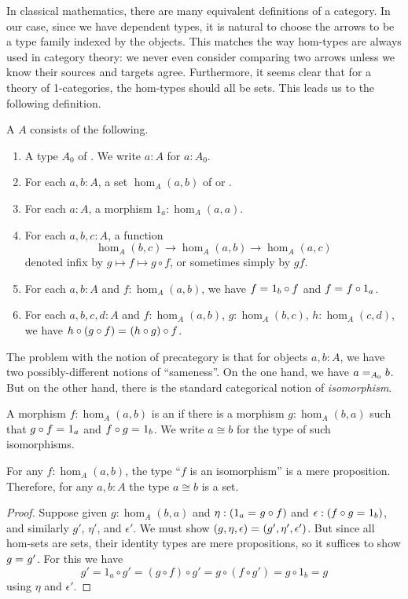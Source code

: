 In classical mathematics, there are many equivalent definitions of a category.
In our case, since we have dependent types, it is natural to choose the arrows to be a type family indexed by the objects.
This matches the way hom-types are always used in category theory: we never even consider comparing two arrows unless we know their sources and targets agree.
Furthermore, it seems clear that for a theory of 1-categories, the hom-types should all be sets.
This leads us to the following definition.

\begin{defn}\label{ct:precategory}
  A  $A$ consists of the following.
  \begin{enumerate}
  \item A type $A_0$ of .  We write $a:A$ for $a:A_0$.
  \item For each $a,b:A$, a set $\hom_A(a,b)$ of  or .
  \item For each $a:A$, a morphism $1_a:\hom_A(a,a)$.
  \item For each $a,b,c:A$, a function
    \[  \hom_A(b,c) \to \hom_A(a,b) \to \hom_A(a,c) \]
    denoted infix by $g\mapsto f\mapsto g\circ f$, or sometimes simply by $gf$.
  \item For each $a,b:A$ and $f:\hom_A(a,b)$, we have $\id f {1_b\circ f}$ and $\id f {f\circ 1_a}$.
  \item For each $a,b,c,d:A$ and $f:\hom_A(a,b)$, $g:\hom_A(b,c)$, $h:\hom_A(c,d)$, we have $\id {h\circ (g\circ f)}{(h\circ g)\circ f}$.
  \end{enumerate}
\end{defn}

The problem with the notion of precategory is that for objects $a,b:A$, we have two possibly-different notions of ``sameness''.
On the one hand, we have $\id[A_0]{a}{b}$.
But on the other hand, there is the standard categorical notion of \emph{isomorphism}.

\begin{defn}\label{ct:isomorphism}
  A morphism $f:\hom_A(a,b)$ is an  if there is a morphism $g:\hom_A(b,a)$ such that $\id{g\circ f}{1_a}$ and $\id{f\circ g}{1_b}$.
  We write $a\cong b$ for the type of such isomorphisms.
\end{defn}

\begin{lem}\label{ct:isoprop}
  For any $f:\hom_A(a,b)$, the type ``$f$ is an isomorphism'' is a mere proposition.
  Therefore, for any $a,b:A$ the type $a\cong b$ is a set.
\end{lem}
\begin{proof}
  Suppose given $g:\hom_A(b,a)$ and $\eta:(\id{1_a}{g\circ f})$ and $\epsilon:(\id{f\circ g}{1_b})$, and similarly $g'$, $\eta'$, and $\epsilon'$.
We must show $\id{(g,\eta,\epsilon)}{(g',\eta',\epsilon')}$.
  But since all hom-sets are sets, their identity types are mere propositions, so it suffices to show $\id g {g'}$.
  For this we have
  \[g' = 1_a\circ g' = (g\circ f)\circ g' = g\circ (f\circ g') = g\circ 1_b = g\]
  using $\eta$ and $\epsilon'$.
\end{proof}

